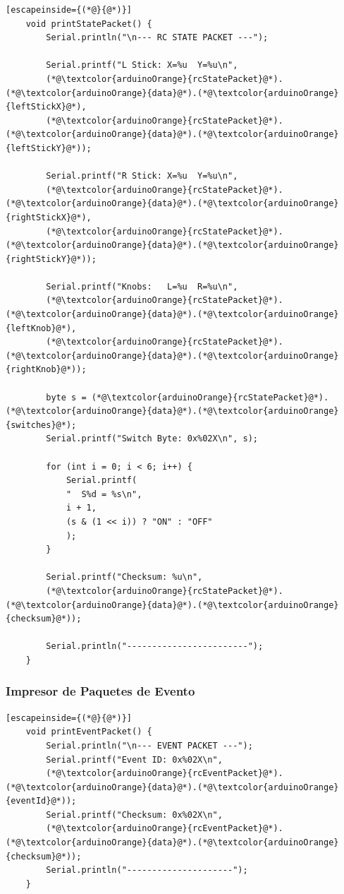 \documentclass[12pt,a4paper]{article}
\begin{document}
\begin{lstlisting}[escapeinside={(*@}{@*)}]
	void printStatePacket() {
		Serial.println("\n--- RC STATE PACKET ---");
		
		Serial.printf("L Stick: X=%u  Y=%u\n",
		(*@\textcolor{arduinoOrange}{rcStatePacket}@*).(*@\textcolor{arduinoOrange}{data}@*).(*@\textcolor{arduinoOrange}{leftStickX}@*),
		(*@\textcolor{arduinoOrange}{rcStatePacket}@*).(*@\textcolor{arduinoOrange}{data}@*).(*@\textcolor{arduinoOrange}{leftStickY}@*));
		
		Serial.printf("R Stick: X=%u  Y=%u\n",
		(*@\textcolor{arduinoOrange}{rcStatePacket}@*).(*@\textcolor{arduinoOrange}{data}@*).(*@\textcolor{arduinoOrange}{rightStickX}@*),
		(*@\textcolor{arduinoOrange}{rcStatePacket}@*).(*@\textcolor{arduinoOrange}{data}@*).(*@\textcolor{arduinoOrange}{rightStickY}@*));
		
		Serial.printf("Knobs:   L=%u  R=%u\n",
		(*@\textcolor{arduinoOrange}{rcStatePacket}@*).(*@\textcolor{arduinoOrange}{data}@*).(*@\textcolor{arduinoOrange}{leftKnob}@*),
		(*@\textcolor{arduinoOrange}{rcStatePacket}@*).(*@\textcolor{arduinoOrange}{data}@*).(*@\textcolor{arduinoOrange}{rightKnob}@*));
		
		byte s = (*@\textcolor{arduinoOrange}{rcStatePacket}@*).(*@\textcolor{arduinoOrange}{data}@*).(*@\textcolor{arduinoOrange}{switches}@*);
		Serial.printf("Switch Byte: 0x%02X\n", s);
		
		for (int i = 0; i < 6; i++) {
			Serial.printf(
			"  S%d = %s\n",
			i + 1,
			(s & (1 << i)) ? "ON" : "OFF"
			);
		}
		
		Serial.printf("Checksum: %u\n",
		(*@\textcolor{arduinoOrange}{rcStatePacket}@*).(*@\textcolor{arduinoOrange}{data}@*).(*@\textcolor{arduinoOrange}{checksum}@*));
		
		Serial.println("------------------------");
	}
\end{lstlisting}

\subsubsection{Impresor de Paquetes de Evento}

\begin{lstlisting}[escapeinside={(*@}{@*)}]
	void printEventPacket() {
		Serial.println("\n--- EVENT PACKET ---");
		Serial.printf("Event ID: 0x%02X\n",
		(*@\textcolor{arduinoOrange}{rcEventPacket}@*).(*@\textcolor{arduinoOrange}{data}@*).(*@\textcolor{arduinoOrange}{eventId}@*));
		Serial.printf("Checksum: 0x%02X\n",
		(*@\textcolor{arduinoOrange}{rcEventPacket}@*).(*@\textcolor{arduinoOrange}{data}@*).(*@\textcolor{arduinoOrange}{checksum}@*));
		Serial.println("---------------------");
	}
\end{lstlisting}
\end{document}
